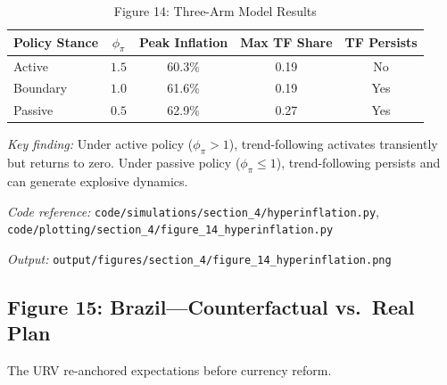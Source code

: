 \documentclass[11pt]{article}
\begin{document}
\begin{table}[htbp]
\centering
\caption{Figure 14: Three-Arm Model Results}
\label{tab:hyperinflation}
\begin{threeparttable}
\begin{tabular}{lcccc}
\toprule
Policy Stance & $\phi_\pi$ & Peak Inflation & Max TF Share & TF Persists \\
\midrule
Active & $1.5$ & 60.3\% & 0.19 & No \\
Boundary & $1.0$ & 61.6\% & 0.19 & Yes \\
Passive & $0.5$ & 62.9\% & 0.27 & Yes \\
\bottomrule
\end{tabular}
\begin{tablenotes}
\small
\item \textit{Key finding:} Under active policy ($\phi_\pi > 1$), trend-following activates transiently but returns to zero. Under passive policy ($\phi_\pi \leq 1$), trend-following persists and can generate explosive dynamics.
\item \textit{Code reference:} \texttt{code/simulations/section\_4/hyperinflation.py}, \texttt{code/plotting/section\_4/figure\_14\_hyperinflation.py}
\item \textit{Output:} \texttt{output/figures/section\_4/figure\_14\_hyperinflation.png}
\end{tablenotes}
\end{threeparttable}
\end{table}

\subsection{Figure 15: Brazil---Counterfactual vs.\ Real Plan}

The URV re-anchored expectations before currency reform.
\end{document}
